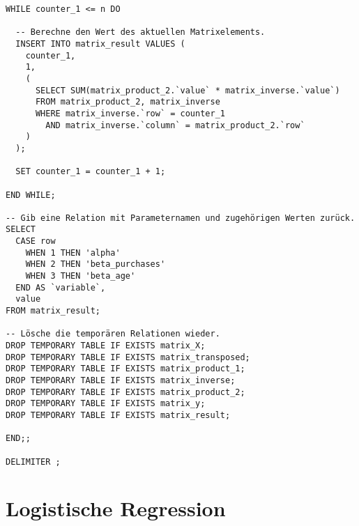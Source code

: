 \begin{verbatim}
WHILE counter_1 <= n DO

  -- Berechne den Wert des aktuellen Matrixelements.
  INSERT INTO matrix_result VALUES (
    counter_1,
    1,
    (
      SELECT SUM(matrix_product_2.`value` * matrix_inverse.`value`)
      FROM matrix_product_2, matrix_inverse
      WHERE matrix_inverse.`row` = counter_1
        AND matrix_inverse.`column` = matrix_product_2.`row`
    )
  );

  SET counter_1 = counter_1 + 1;

END WHILE;

-- Gib eine Relation mit Parameternamen und zugehörigen Werten zurück.
SELECT
  CASE row
    WHEN 1 THEN 'alpha'
    WHEN 2 THEN 'beta_purchases'
    WHEN 3 THEN 'beta_age'
  END AS `variable`,
  value
FROM matrix_result;

-- Lösche die temporären Relationen wieder.
DROP TEMPORARY TABLE IF EXISTS matrix_X;
DROP TEMPORARY TABLE IF EXISTS matrix_transposed;
DROP TEMPORARY TABLE IF EXISTS matrix_product_1;
DROP TEMPORARY TABLE IF EXISTS matrix_inverse;
DROP TEMPORARY TABLE IF EXISTS matrix_product_2;
DROP TEMPORARY TABLE IF EXISTS matrix_y;
DROP TEMPORARY TABLE IF EXISTS matrix_result;

END;;

DELIMITER ;
\end{verbatim}

\section{Logistische Regression}
\label{appendix:D:3}

